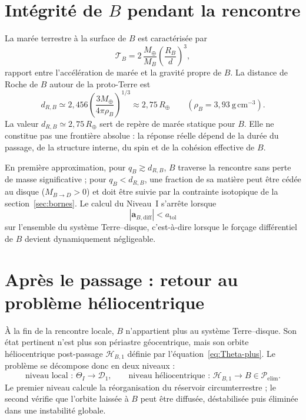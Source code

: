 \documentclass[11pt,a4paper,openany]{report}
\newcommand{\Mt}{M_{\oplus}}
\newcommand{\Rt}{R_{\oplus}}
\begin{document}
\section{Intégrité de \texorpdfstring{$B$}{B} pendant la rencontre}

La marée terrestre à la surface de $B$ est caractérisée par
\begin{equation}
\mathcal{T}_B=2\,\frac{\Mt}{M_B}\left(\frac{R_B}{d}\right)^3,
\label{eq:TB}
\end{equation}
rapport entre l'accélération de marée et la gravité propre de $B$. La distance de Roche de $B$
autour de la proto-Terre est
\begin{equation}
d_{R,B}\simeq2{,}456\left(\frac{3\Mt}{4\pi\rho_B}\right)^{1/3}\approx2{,}75\,\Rt
\qquad(\rho_B=3{,}93\ \mathrm{g\,cm^{-3}}).
\label{eq:RocheB}
\end{equation}
La valeur $d_{R,B}\simeq2{,}75\,\Rt$ sert de repère de marée statique pour $B$. Elle ne constitue
pas une frontière absolue : la réponse réelle dépend de la durée du passage, de la structure
interne, du spin et de la cohésion effective de $B$.

En première approximation, pour $q_B\gtrsim d_{R,B}$, $B$ traverse la rencontre sans perte de masse significative ; pour
$q_B<d_{R,B}$, une fraction de sa matière peut être cédée au disque ($M_{B\to D}>0$) et doit être
suivie par la contrainte isotopique de la section~\ref{sec:bornes}. Le calcul du Niveau~I s'arrête
lorsque
\begin{equation}
|\mathbf{a}_{B,\mathrm{diff}}|<a_{\mathrm{tol}}
\label{eq:atol}
\end{equation}
sur l'ensemble du système Terre--disque, c'est-à-dire lorsque le forçage différentiel de $B$
devient dynamiquement négligeable.

\section{Après le passage : retour au problème héliocentrique}
\label{sec:retour-heliocentrique}

À la fin de la rencontre locale, $B$ n'appartient plus au système Terre--disque. Son état pertinent
n'est plus son périastre géocentrique, mais son orbite héliocentrique post-passage
$\mathcal{H}_{B,1}$ définie par l'équation~\eqref{eq:Theta-plus}. Le problème se décompose donc en
deux niveaux :
\begin{equation}
\boxed{\;\text{niveau local : } \Theta_I\to\mathcal{D}_1,
\qquad
\text{niveau héliocentrique : } \mathcal{H}_{B,1}\to B\in\mathcal{P}_{\mathrm{elim}}.\;}
\label{eq:deux-niveaux-B}
\end{equation}
Le premier niveau calcule la réorganisation du réservoir circumterrestre ; le second vérifie que
l'orbite laissée à $B$ peut être diffusée, déstabilisée puis éliminée dans une instabilité globale.
\end{document}
